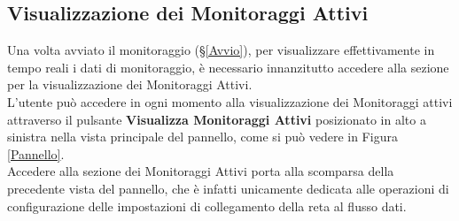 \subsection{Visualizzazione dei Monitoraggi Attivi}\label{MonitoraggiAttivi}

Una volta avviato il monitoraggio (§\ref{Avvio}), per visualizzare effettivamente in tempo reali i dati di monitoraggio, è necessario innanzitutto accedere alla sezione per la visualizzazione dei Monitoraggi Attivi.\\
L'utente può accedere in ogni momento alla visualizzazione dei Monitoraggi attivi attraverso il pulsante \textbf{Visualizza Monitoraggi Attivi} posizionato in alto a sinistra nella vista principale del pannello, come si può vedere in Figura \ref{Pannello}.\\

Accedere alla sezione dei Monitoraggi Attivi porta alla scomparsa della precedente vista del pannello, che è infatti unicamente dedicata alle operazioni di configurazione delle impostazioni di collegamento della reta al flusso dati.

